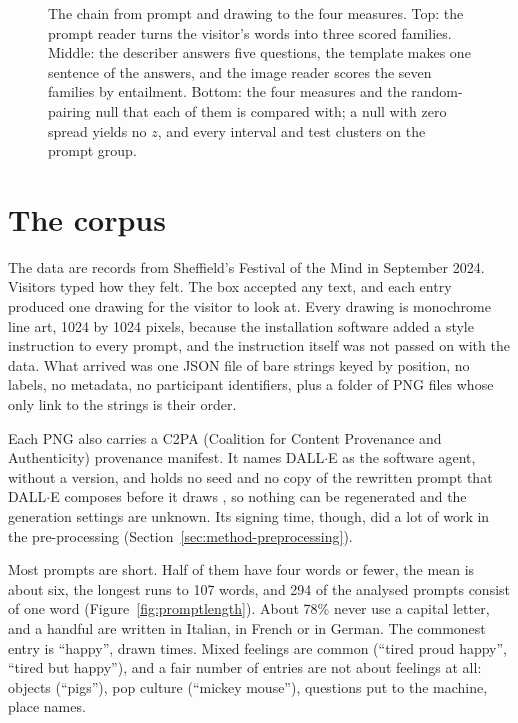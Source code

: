 \begin{figure}[htbp]
\centering
\resizebox{\textwidth}{!}{}
\caption{The chain from prompt and drawing to the four measures. Top: the prompt reader turns the visitor's words into three scored families. Middle: the describer answers five questions, the template makes one sentence of the answers, and the image reader scores the seven families by entailment. Bottom: the four measures and the random-pairing null that each of them is compared with; a null with zero spread yields no $z$, and every interval and test clusters on the prompt group.}
\label{fig:pipeline}
\end{figure}

\section{The corpus}
\label{sec:method-corpus}

The data are \nTotal{} records from Sheffield's Festival of the Mind in September 2024. Visitors typed how they felt. The box accepted any text, and each entry produced one drawing for the visitor to look at. Every drawing is monochrome line art, 1024 by 1024 pixels, because the installation software added a style instruction to every prompt, and the instruction itself was not passed on with the data. What arrived was one JSON file of \nTotal{} bare strings keyed by position, no labels, no metadata, no participant identifiers, plus a folder of \nTotal{} PNG files whose only link to the strings is their order.

Each PNG also carries a C2PA (Coalition for Content Provenance and Authenticity) provenance manifest. It names DALL$\cdot$E as the software agent, without a version, and holds no seed and no copy of the rewritten prompt that DALL$\cdot$E composes before it draws \cite{betker2023improving}, so nothing can be regenerated and the generation settings are unknown. Its signing time, though, did a lot of work in the pre-processing (Section~\ref{sec:method-preprocessing}).

Most prompts are short. Half of them have four words or fewer, the mean is about six, the longest runs to 107 words, and 294 of the analysed prompts consist of one word (Figure~\ref{fig:promptlength}). About 78\% never use a capital letter, and a handful are written in Italian, in French or in German. The commonest entry is ``happy'', drawn \nHappy{} times. Mixed feelings are common (``tired proud happy'', ``tired but happy''), and a fair number of entries are not about feelings at all: objects (``pigs''), pop culture (``mickey mouse''), questions put to the machine, place names.

